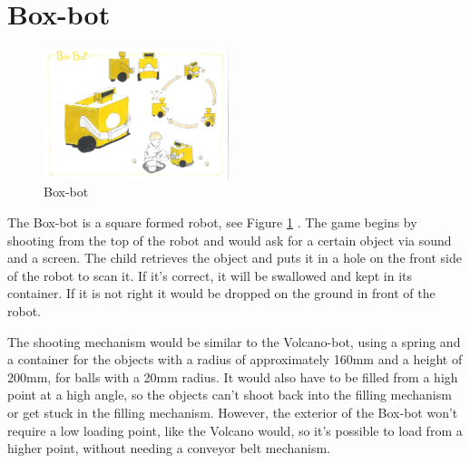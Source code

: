 \documentclass[11pt,twoside,a4paper]{report}
\begin{document}
\section{Box-bot}
\begin{figure}
  \begin{center}
    \includegraphics[width=0.48\textwidth]{Images/BoxBotConcept.pdf}
  \end{center}
  \caption{Box-bot}
  \label{figure:boxbot}
\end{figure}
The Box-bot is a square formed robot, see Figure \ref{figure:boxbot} . The game begins by shooting from the top of the robot and would ask for a certain object via sound and a screen. The child retrieves the object and puts it in a hole on the front side of the robot to scan it. If it\rq{}s correct, it will be swallowed and kept in its container. If it is not right it would be dropped on the ground in front of the robot.

The shooting mechanism would be similar to the Volcano-bot, using a spring and a container for the objects with a radius of approximately 160mm and a height of 200mm, for balls with a 20mm radius. It would also have to be filled from a high point at a high angle, so the objects can\rq{}t shoot back into the filling mechanism or get stuck in the filling mechanism. However, the exterior of the Box-bot won\rq{}t require a low loading point, like the Volcano would, so it\rq{}s possible to load from a higher point, without needing a conveyor belt mechanism.
\end{document}
